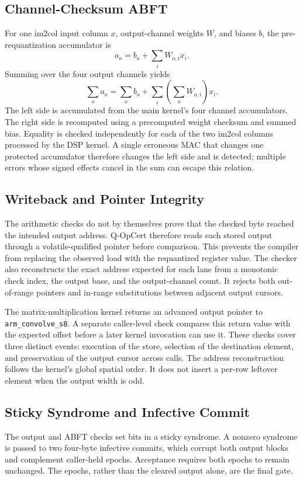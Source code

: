 \documentclass[conference]{IEEEtran}
\begin{document}
\subsection{Channel-Checksum ABFT}
For one im2col input column $x$, output-channel weights $W$, and biases $b$, the pre-requantization accumulator is
\begin{equation}
 a_o=b_o+\sum_i W_{o,i}x_i.
\end{equation}
Summing over the four output channels yields
\begin{equation}
 \sum_o a_o=\sum_o b_o+\sum_i\left(\sum_o W_{o,i}\right)x_i.
 \label{eq:abft}
\end{equation}
The left side is accumulated from the main kernel's four channel accumulators. The right side is recomputed using a precomputed weight checksum and summed bias. Equality is checked independently for each of the two im2col columns processed by the DSP kernel. A single erroneous MAC that changes one protected accumulator therefore changes the left side and is detected; multiple errors whose signed effects cancel in the sum can escape this relation.

\subsection{Writeback and Pointer Integrity}
The arithmetic checks do not by themselves prove that the checked byte reached the intended output address. Q-OpCert therefore reads each stored output through a volatile-qualified pointer before comparison. This prevents the compiler from replacing the observed load with the requantized register value. The checker also reconstructs the exact address expected for each lane from a monotonic check index, the output base, and the output-channel count. It rejects both out-of-range pointers and in-range substitutions between adjacent output cursors.

The matrix-multiplication kernel returns an advanced output pointer to \texttt{arm\_convolve\_s8}. A separate caller-level check compares this return value with the expected offset before a later kernel invocation can use it. These checks cover three distinct events: execution of the store, selection of the destination element, and preservation of the output cursor across calls. The address reconstruction follows the kernel's global spatial order. It does not insert a per-row leftover element when the output width is odd.

\subsection{Sticky Syndrome and Infective Commit}
The output and ABFT checks set bits in a sticky syndrome. A nonzero syndrome is passed to two four-byte infective commits, which corrupt both output blocks and complement caller-held epochs. Acceptance requires both epochs to remain unchanged. The epochs, rather than the cleared output alone, are the final gate.
\end{document}
